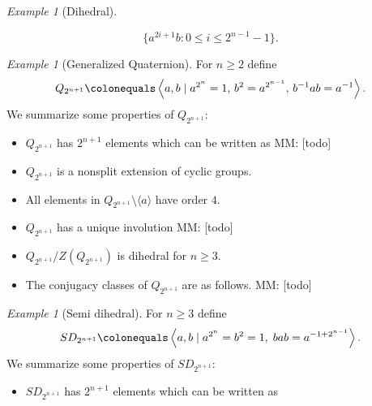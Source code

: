 \documentclass{dcthesis}
\newcommand{\mm}[1]{{\color{blue} \sf MM: [#1]}}
\numberwithin{equation}{section}
\theoremstyle{definition}
\theoremstyle{remark}
\newtheorem{example}[equation]{Example}
\begin{document}
{{\begin{example}[Dihedral]
\begin{itemize}
\begin{equation}
            \{a^{2i+1}b : 0\leq i\leq 2^{n-1}-1\}.
          \end{equation}
      \end{itemize}
    \end{example}
    \begin{example}[Generalized Quaternion]
      \label{exm:generalizedquaternion}
      For $n\geq 2$ define
      \begin{equation}
        \label{eqn:quaternionpresentation}
        Q_{2^{n+1}}
        \colonequals
        \left\langle
          a,b\mid
          a^{2^n}=1,\,
          b^2=a^{2^{n-1}},\,
          b^{-1}ab=a^{-1}
        \right\rangle.
      \end{equation}
      We summarize some properties of $Q_{2^{n+1}}$:
      \begin{itemize}
        \item
          $Q_{2^{n+1}}$ has $2^{n+1}$ elements
          which can be written as
          \mm{todo}
        \item
          $Q_{2^{n+1}}$ is a nonsplit extension
          of cyclic groups.
        \item
          All elements in
          $Q_{2^{n+1}}\setminus\langle a\rangle$
          have order $4$.
        \item
          $Q_{2^{n+1}}$ has a unique involution
          \mm{todo}
        \item
          $Q_{2^{n+1}}/Z(Q_{2^{n+1}})$ is dihedral
          for $n\geq 3$.
        \item
          The conjugacy classes of
          $Q_{2^{n+1}}$ are as follows.
          \mm{todo}
      \end{itemize}
    \end{example}
    \begin{example}[Semi dihedral]
      \label{exm:semidihedral}
      For $n\geq 3$ define
      \begin{equation}
        \label{eqn:semidehedralpresentation}
        SD_{2^{n+1}}
        \colonequals
        \left\langle
          a,b\mid
          a^{2^{n}}=b^2=1,\;
          bab=a^{-1+2^{n-1}}
        \right\rangle.
      \end{equation}
      We summarize some properties of $SD_{2^{n+1}}$:
      \begin{itemize}
        \item
          $SD_{2^{n+1}}$ has $2^{n+1}$ elements
          which can be written as

\end{itemize}
\end{example}}}
\end{document}
